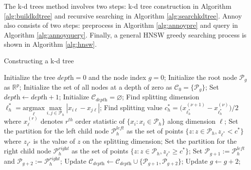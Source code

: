 The k-d trees method involves two steps: k-d tree construction in Algorithm \ref{alg:buildkdtree} and recursive searching in Algorithm \ref{alg:searchkdtree}.
Annoy also consists of two steps: preprocess in Algorithm \ref{alg:annoypre} and query in Algorithm \ref{alg:annoyquery}.
Finally, a general HNSW greedy searching process is shown in Algorithm \ref{alg:hnsw}.

\begin{algorithm}[!htb]
  \caption{Constructing a k-d tree}
  \label{alg:buildkdtree}
  \begin{algorithmic}[1]
    \STATE Initialize the tree $\textit{depth}=0$ and the node index $g=0$;
    \STATE Initialize the root node $\mathcal{P}_g$ as $\mathbb{R}^p$;
    \STATE Initialize the set of all nodes at a depth of zero as $\mathcal{C}_0=\{\mathcal{P}_g\}$;
      \STATE Set $\textit{depth}\leftarrow \textit{depth}+1$;
      \STATE Initialize $\mathcal{C}_{\textit{depth}}=\varnothing$;
        \STATE Find splitting dimension $\ell_h^*=\underset{\ell}{\textrm{argmax}}\underset{i,j\in\mathcal{P}_h}{\max}|x_{i\ell}-x_{j\ell}|$;
        \STATE Find splitting value $c_h^*=\big(x^{(\nu+1)}_{{\ell_h^*}}-x^{(\nu)}_{{\ell_h^*}}\big)/2$ where $x^{(r)}_{\ell}$ denotes $r^{th}$ order statistic of $\{x_i:x_{i}\in\mathcal{P}_h\}$ along dimension $\ell$;
        \STATE Set the partition for the left child node $\mathcal{P}^{\textit{left}}_h$ as the set of points $\{z:z\in\mathcal{P}_h, z_{\ell^*}<c^*\}$ where $z_{\ell^*}$ is the value of $z$ on the splitting dimension;
        \STATE Set the partition for the right child node $\mathcal{P}^{\textit{right}}_h$ as the set of points $\{z:z\in\mathcal{P}_h, z_{\ell^*}\geq c^*\}$;
        \STATE Set $\mathcal{P}_{g+1}:=\mathcal{P}_h^{\textit{left}}$ and $\mathcal{P}_{g+2}:=\mathcal{P}_h^{\textit{right}}$;
        \STATE Update $\mathcal{C}_{\textit{depth}}\leftarrow\mathcal{C}_{\textit{depth}}\cup\{\mathcal{P}_{g+1},\mathcal{P}_{g+2}\}$;
        \STATE Update $g\leftarrow g+2$;
      \ENDFOR
    \ENDWHILE
  \end{algorithmic}
\end{algorithm}

